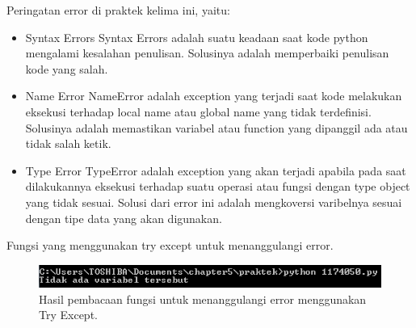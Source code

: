 \hfill \break
Peringatan error di praktek kelima ini, yaitu:
\begin{itemize}
	\item Syntax Errors
	Syntax Errors adalah suatu keadaan saat kode python mengalami kesalahan penulisan. Solusinya adalah memperbaiki penulisan kode yang salah.
	
	\item Name Error
	NameError adalah exception yang terjadi saat kode melakukan eksekusi terhadap local name atau global name yang tidak terdefinisi. Solusinya adalah memastikan variabel atau function yang dipanggil ada atau tidak salah ketik.
	
	\item Type Error
	TypeError adalah exception yang akan terjadi apabila pada saat dilakukannya eksekusi terhadap suatu operasi atau fungsi dengan type object yang tidak sesuai. Solusi dari error ini adalah mengkoversi varibelnya sesuai dengan tipe data yang akan digunakan.
\end{itemize}

\hfill \break
Fungsi yang menggunakan try except untuk menanggulangi error.



\begin{figure}[H]
	\includegraphics[width=12cm]{figures/5/1174050/Praktek/error.png}
	\centering
	\caption{Hasil pembacaan fungsi untuk menanggulangi error menggunakan Try Except.}
\end{figure}
	